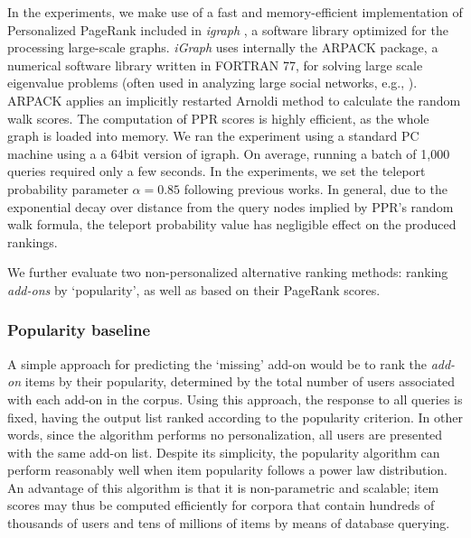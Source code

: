 \documentclass[11pt,oneside]{book}
\let\Oldsubsubsection\subsubsection
\renewcommand{\subsubsection}{\FloatBarrier\Oldsubsubsection}
\begin{document}
In the experiments, we make use of a fast and memory-efficient implementation of Personalized PageRank included in {\it igraph} \citep{igraph}, a software library optimized for the processing large-scale graphs. {\it iGraph} uses internally the ARPACK package, a numerical software library written in FORTRAN 77, for solving large scale eigenvalue problems (often used in analyzing large social networks, e.g., \citep{ting2004minig}). ARPACK applies an implicitly restarted Arnoldi method to calculate the random walk scores. The computation of PPR scores is highly efficient, as the whole graph is loaded into memory. We ran the experiment using a standard PC machine using a a 64bit version of igraph. On average, running a batch of 1,000 queries required only a few seconds. In the experiments, we set the teleport probability parameter $\alpha=0.85$ following previous works. In general, due to the exponential decay over distance from the query nodes implied by PPR's random walk formula, the teleport probability value has negligible effect on the produced rankings.

We further evaluate two non-personalized alternative ranking methods: ranking {\it add-ons} by `popularity', as well as based on their PageRank scores. 

\subsubsection{Popularity baseline} 

A simple approach for predicting the `missing' add-on would be to rank the {\it add-on} items by their popularity, determined by the total number of users associated with each add-on in the corpus. Using this approach, the response to all queries is fixed, having the output list ranked according to the popularity criterion. In other words, since the algorithm performs no personalization, all users are presented with the same
add-on list. Despite its simplicity, the popularity algorithm can perform reasonably well when item popularity follows a power law distribution. An advantage of this algorithm is that it is non-parametric and scalable; item scores may thus be computed efficiently for corpora that contain hundreds of thousands of users and tens of millions of items by means of database querying. 
\end{document}
